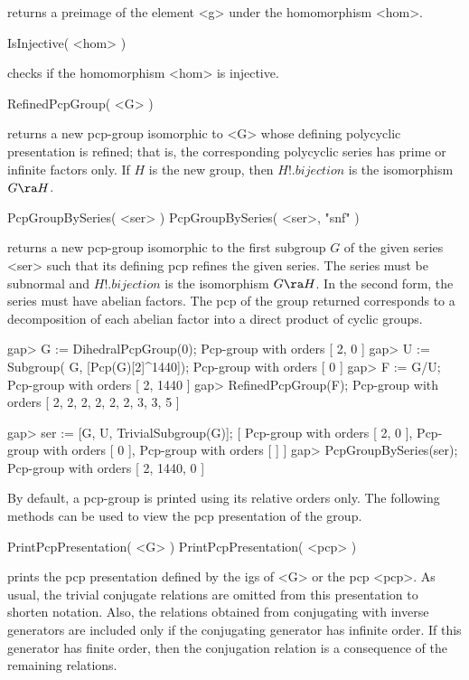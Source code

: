 returns a preimage of the element <g> under the homomorphism <hom>.

\>IsInjective( <hom> )

checks if the homomorphism <hom> is injective.



\>RefinedPcpGroup( <G> )

returns a new  pcp-group isomorphic to  <G>  whose defining polycyclic
presentation is refined;  that is, the corresponding polycyclic series
has  prime or infinite  factors only. If  $H$ is  the  new group, then
$H!.bijection$ is the isomorphism $G \ra H$.

\>PcpGroupBySeries( <ser> )
\>PcpGroupBySeries( <ser>, "snf" )

returns a  new pcp-group isomorphic to  the first subgroup  $G$ of the
given  series <ser>  such  that  its defining  pcp  refines the  given
series.  The  series  must  be  subnormal and  $H!.bijection$  is  the
isomorphism  $G \ra  H$.  In  the second  form, the  series  must have
abelian  factors.  The  pcp of  the  group returned  corresponds to  a
decomposition of each  abelian factor into a direct  product of cyclic
groups.

\beginexample
gap> G := DihedralPcpGroup(0);
Pcp-group with orders [ 2, 0 ]
gap>  U := Subgroup( G, [Pcp(G)[2]^1440]);
Pcp-group with orders [ 0 ]
gap>  F := G/U;
Pcp-group with orders [ 2, 1440 ]
gap> RefinedPcpGroup(F);
Pcp-group with orders [ 2, 2, 2, 2, 2, 2, 3, 3, 5 ]

gap> ser := [G, U, TrivialSubgroup(G)];
[ Pcp-group with orders [ 2, 0 ],
  Pcp-group with orders [ 0 ],
  Pcp-group with orders [  ] ]
gap>  PcpGroupBySeries(ser);
Pcp-group with orders [ 2, 1440, 0 ]
\endexample


By default, a pcp-group is printed using its relative orders only. The
following methods can be used to view the pcp presentation of the group.

\> PrintPcpPresentation( <G> )
\> PrintPcpPresentation( <pcp> )

prints the pcp presentation defined by the igs of <G> or the pcp <pcp>. 
As usual, the trivial conjugate relations are omitted from this 
presentation to shorten notation. Also, the relations obtained from
conjugating with inverse generators are included only if the conjugating
generator has infinite order. If this generator has finite order, then
the conjugation relation is a consequence of the remaining relations.

